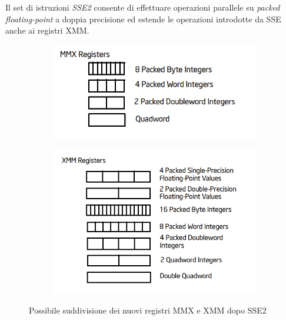 \documentclass[Lau, oneside]{sapthesis}%
\begin{document}
Il set di istruzioni \textit{SSE2} consente di effettuare operazioni parallele su \textit{packed floating-point} a doppia precisione ed estende le operazioni introdotte da SSE anche ai registri XMM.
\newline \newline
\begin{figure}[h]
\centering
\begin{subfigure}{.5\textwidth}
  \centering
  \includegraphics[width=1\linewidth]{foto/mmx.png}
  \label{fig:sub1}
\end{subfigure}%
\begin{subfigure}{.5\textwidth}
  \centering
  \includegraphics[width=1.005\linewidth]{foto/xmm.png}
  \label{fig:sub2}
\end{subfigure}
\caption{Possibile suddivisione dei nuovi registri MMX e XMM dopo SSE2}
\label{fig:mmx}
\end{figure}
\end{document}
